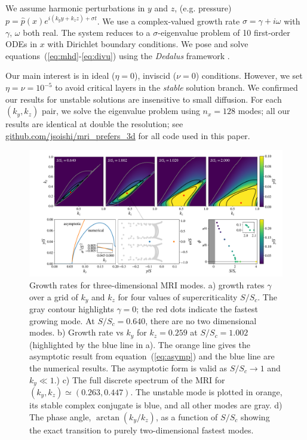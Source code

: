 \documentclass[aps,prl,reprint,superscriptaddress]{revtex4-1}
\newcommand{\SSC}{S/S_{c}}
\begin{document}
We assume harmonic perturbations in $y$ and $z$, (e.g. pressure) $p=\hat{p}(x)e^{i(k_{y}y+k_{z}z)+\sigma{t}}$. 
We use a complex-valued growth rate $\sigma=\gamma+i\omega$ with $\gamma,\,\omega$ both real. 
The system reduces to a $\sigma$-eigenvalue problem of 10 first-order ODEs in $x$ with Dirichlet boundary conditions.
We pose and solve equations~(\ref{eq:mhd}-\ref{eq:divu}) using the \emph{Dedalus} framework \citep{The Dedalus paper}. 

Our main interest is in ideal ($\eta=0$), inviscid ($\nu=0$) conditions.
However, we set $\eta=\nu=10^{-5}$ to avoid critical layers in the \textit{stable} solution branch.
We confirmed our results for unstable solutions are insensitive to small diffusion. 
For each $(k_{y},k_{z})$ pair, we solve the eigenvalue problem using $n_{x}=128$ modes; all our results are identical at double the resolution; see \protect\url{github.com/jsoishi/mri_prefers_3d} for all code used in this paper.
\begin{figure}[ht]
  \includegraphics[width=\textwidth]{fig_1.pdf}
  \caption{Growth rates for three-dimensional MRI modes. 
  a) growth rates $\gamma$ over a grid of $k_{y}$ and $k_{z}$ for four values of supercriticality $\SSC$. 
  The gray contour highlights $\gamma=0$; the red dots indicate the fastest growing mode. 
  At $\SSC=0.640$, there are no two dimensional modes. 
  b) Growth rate vs $k_{y}$ for $k_{z}=0.259$ at $\SSC=1.002$ (highlighted by the blue line in a). 
  The orange line gives the asymptotic result from equation~(\ref{eq:asymp}) and the blue line are the numerical results. 
  The asymptotic form is valid as $\SSC\to1$ and $k_{y}\ll1$.) c) The full discrete spectrum of the MRI for $(k_{y},k_{z})\simeq(0.263,0.447)$. 
  The unstable mode is plotted in orange, its stable complex conjugate is blue, and all other modes are gray. 
  d) The phase angle, $\arctan(k_{y}/k_{z})$, as a function of $\SSC$ showing the exact transition to purely two-dimensional fastest modes.}
  \label{fig:growth_rate}
\end{figure}
\end{document}
